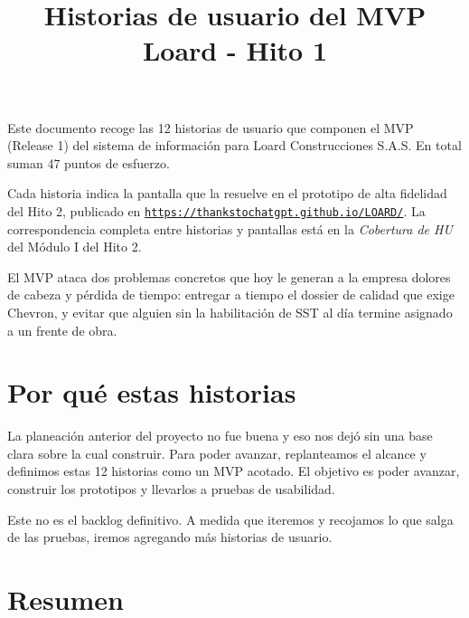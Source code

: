 \documentclass[11pt]{article}
\title{Historias de usuario del MVP\\[0.3em]
\large Loard - Hito 1}
\author{}
\date{}
\newcommand{\urlapp}{https://thankstochatgpt.github.io/LOARD}
\begin{document}
\maketitle
\tableofcontents


Este documento recoge las 12 historias de usuario que componen el MVP (Release 1) del sistema de información para Loard Construcciones S.A.S. En total suman 47 puntos de esfuerzo.

Cada historia indica la pantalla que la resuelve en el prototipo de alta fidelidad del Hito 2, publicado en \href{\urlapp/}{\nolinkurl{https://thankstochatgpt.github.io/LOARD/}}. La correspondencia completa entre historias y pantallas está en la \emph{Cobertura de HU} del Módulo I del Hito 2.

El MVP ataca dos problemas concretos que hoy le generan a la empresa dolores de cabeza y pérdida de tiempo: entregar a tiempo el dossier de calidad que exige Chevron, y evitar que alguien sin la habilitación de SST al día termine asignado a un frente de obra.

\section{Por qué estas historias}

La planeación anterior del proyecto no fue buena y eso nos dejó sin una base clara sobre la cual construir. Para poder avanzar, replanteamos el alcance y definimos estas 12 historias como un MVP acotado. El objetivo es poder avanzar, construir los prototipos y llevarlos a pruebas de usabilidad.

Este no es el backlog definitivo. A medida que iteremos y recojamos lo que salga de las pruebas, iremos agregando más historias de usuario.

\section{Resumen}
\end{document}
